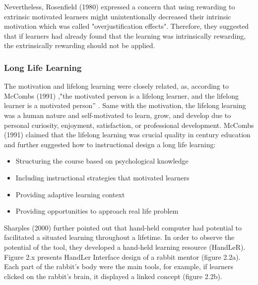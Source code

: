 Nevertheless, Rosenfield (1980) \cite{rosenfield1980rewards} expressed a concern that using rewarding to extrinsic motivated learners might unintentionally decreased their intrinsic motivation which was called "overjustification effects". Therefore, they suggested that if learners had already found that the learning was intrinsically rewarding, the extrinsically rewarding should not be applied. 

\subsubsection{Long Life Learning} 

The motivation and lifelong learning were closely related, as, according to McCombs (1991) \cite{mccombs1991motivation},"the motivated person is a lifelong learner, and the lifelong learner is a motivated person'' \cite [pp. 117]{mccombs1991motivation}. Same with the motivation, the lifelong learning was a human nature and self-motivated to learn, grow, and develop due to personal curiosity, enjoyment, satisfaction, or professional development. McCombs (1991) \cite{mccombs1991motivation}claimed that the lifelong learning was crucial quality in  century education and further suggested how to instructional design a long life learning: 
\begin{itemize} 
\item Structuring the course based on psychological knowledge 
\item Including instructional strategies that motivated learners 
\item Providing adaptive learning context 
\item Providing opportunities to approach real life problem 
\end{itemize} 

Sharples (2000) \cite{sharples2000design} further pointed out that hand-held computer had potential to facilitated a situated learning throughout a lifetime. In order to observe the potential of the tool, they developed a hand-held learning resource (HandLeR). Figure 2.x presents HandLer Interface design of a rabbit mentor (figure 2.2a). Each part of the rabbit's body were the main tools, for example, if learners clicked on the rabbit's brain, it displayed a linked concept (figure 2.2b). 

